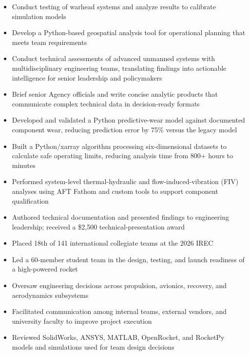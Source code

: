 \documentclass[10pt,letterpaper]{article}
\begin{document}
\resumeHeader
{}


\begin{itemize}
  \item Conduct testing of warhead systems and analyze results to calibrate simulation models
  \item Develop a Python-based geospatial analysis tool for operational planning that meets team requirements
  \item Conduct technical assessments of advanced unmanned systems with multidisciplinary engineering teams, translating findings into actionable intelligence for senior leadership and policymakers
  \item Brief senior Agency officials and write concise analytic products that communicate complex technical data in decision-ready formats
\end{itemize}

\vspace{2pt}
\begin{itemize}
  \item Developed and validated a Python predictive-wear model against documented component wear, reducing prediction error by 75\% versus the legacy model
  \item Built a Python/xarray algorithm processing six-dimensional datasets to calculate safe operating limits, reducing analysis time from 800+ hours to minutes
  \item Performed system-level thermal-hydraulic and flow-induced-vibration (FIV) analyses using AFT Fathom and custom tools to support component qualification
  \item Authored technical documentation and presented findings to engineering leadership; received a \$2,500 technical-presentation award
\end{itemize}

\vspace{2pt}
\earlierRoles
\begin{itemize}
  \item Placed 18th of 141 international collegiate teams at the 2026 IREC
  \item Led a 60-member student team in the design, testing, and launch readiness of a high-powered rocket
  \item Oversaw engineering decisions across propulsion, avionics, recovery, and aerodynamics subsystems
  \item Facilitated communication among internal teams, external vendors, and university faculty to improve project execution
  \item Reviewed SolidWorks, ANSYS, MATLAB, OpenRocket, and RocketPy models and simulations used for team design decisions
\end{itemize}
\end{document}
